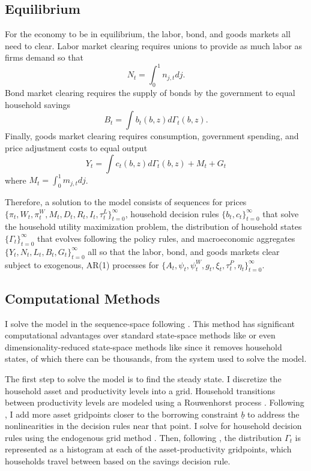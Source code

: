 \subsection{Equilibrium}

For the economy to be in equilibrium, the labor, bond, and goods markets all need to clear. Labor market clearing requires unions to provide as much labor as firms demand so that
\begin{equation*}
    N_t = \int_0^1 n_{j, t} dj.
\end{equation*}
Bond market clearing requires the supply of bonds by the government to equal household savings
\begin{equation*}
    B_t = \int b_t (b, z) d \Gamma_t (b, z).
\end{equation*}
Finally, goods market clearing requires consumption, government spending, and price adjustment costs to equal output
\begin{equation*}
    Y_t = \int c_t (b, z) d \Gamma_t (b, z) + M_t + G_t
\end{equation*}
where $M_t = \int_0^1 m_{j, t} d j$.

Therefore, a solution to the model consists of sequences for prices $\{\pi_t, W_t, \pi_t^W, M_t, D_t, R_t, I_t, \tau_t^L\}_{t = 0}^\infty$, household decision rules $\{b_t, c_t\}_{t = 0}^\infty$ that solve the household utility maximization problem, the distribution of household states $\{\Gamma_t\}_{t = 0}^\infty$ that evolves following the policy rules, and macroeconomic aggregates $\{Y_t, N_t, L_t, B_t, G_t\}_{t = 0}^\infty$ all so that the labor, bond, and goods markets clear subject to exogenous, AR(1) processes for $\{A_t, \psi_t, \psi_t^W, g_t, \xi_t, \tau_t^P, \eta_t\}_{t = 0}^\infty$.


\subsection{Computational Methods}

I solve the model in the sequence-space following \textcite{auclert2021using}. This method has significant computational advantages over standard state-space methods like \textcite{reiter2009solving} or even dimensionality-reduced state-space methods like \textcite{bayer2018solving} since it removes household states, of which there can be thousands, from the system used to solve the model.

The first step to solve the model is to find the steady state. I discretize the household asset and productivity levels into a grid. Household transitions between productivity levels are modeled using a Rouwenhorst process \autocite{kopecky2010finite}. Following \textcite{reiter2009solving}, I add more asset gridpoints closer to the borrowing constraint $\underline{b}$ to address the nonlinearities in the decision rules near that point. I solve for household decision rules using the endogenous grid method \autocite{carroll2006method}. Then, following \textcite{young2010solving}, the distribution $\Gamma_t$ is represented as a histogram at each of the asset-productivity gridpoints, which households travel between based on the savings decision rule.

